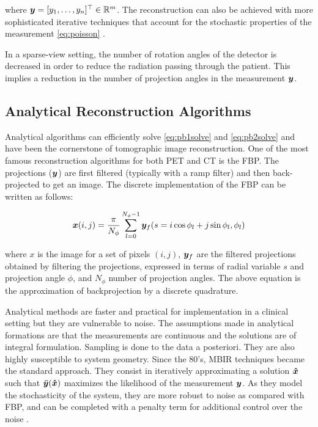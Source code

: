 where $\bm{y}  =  [y_1,\dots,y_n]^\top\in \mathbb{R}^m$. The reconstruction can also be achieved with more sophisticated iterative techniques that account for the stochastic properties of the measurement \eqref{eq:poisson} \cite{nuyts1998iterative,Elbakri2002}.

In a sparse-view setting, the number of rotation angles of the detector is decreased in order to reduce the radiation passing through the patient. This implies a reduction in the number of projection angles in the measurement $\bm{y}$.


\subsection{Analytical Reconstruction Algorithms}
Analytical algorithms can efficiently solve \eqref{eq:pb1solve} and \eqref{eq:pb2solve} and have been the cornerstone of tomographic image reconstruction. One of the most famous reconstruction algorithms for both \ac{PET} and \ac{CT} is the \ac{FBP}. The projections ($\bm{y}$) are first filtered (typically with a ramp filter) and then back-projected to get an image. The discrete implementation of the \ac{FBP} can be written as follows:

\begin{equation}\label{eq:FBP}
	\bm{x}(i,j) = \frac{\pi}{N_\phi}\sum_{l=0}^{N_\phi-1}\bm{y}_f(s=i\cos\phi_l+j\sin\phi_l,\phi_l)
\end{equation}

where $x$ is the image for a set of pixels $(i,j)$, $\bm{y}_f$ are the filtered projections obtained by filtering the projections, expressed in terms of radial variable $s$ and projection angle $\phi$, and $N_\phi$ number of projection angles. The above equation is the approximation of backprojection by a discrete quadrature. 

Analytical methods are faster and practical for implementation in a clinical setting but they are vulnerable to noise. The assumptions made in analytical formations are that the measurements are continuous and the solutions are of integral formulation. Sampling is done to the data a posteriori. They are also highly susceptible to system geometry. Since the 80's, \ac{MBIR} techniques \cite{Shepp1982,fessler2000statistical} became the standard approach. They consist in iteratively approximating a solution $\bm{\hat{x}}$ such that $\bm{\bar{y}}(\bm{\hat{x}})$ maximizes the likelihood of the measurement $\bm{y}$. As they model the stochasticity of the system, they are more robust to noise as compared with \ac{FBP}, and can be completed with a penalty term for additional control over the noise \cite{depierro1995}. 
